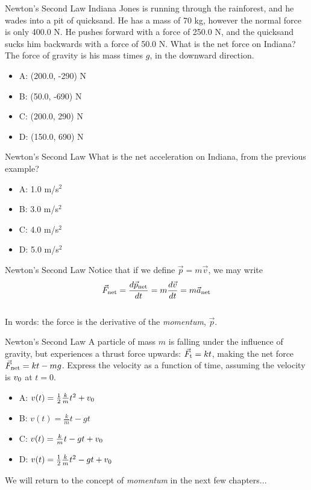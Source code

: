 \documentclass{beamer}
\begin{document}
\begin{frame}{Newton's Second Law}
Indiana Jones is running through the rainforest, and he wades into a pit of quicksand.  He has a mass of 70 kg, however the normal force is only 400.0 N.  He pushes forward with a force of 250.0 N, and the quicksand sucks him backwards with a force of 50.0 N.  What is the net force on Indiana?  The force of gravity is his mass times $g$, in the downward direction.
\begin{itemize}
\item A: (200.0, -290) N
\item B: (50.0, -690) N
\item C: (200.0, 290) N
\item D: (150.0, 690) N
\end{itemize}
\end{frame}

\begin{frame}{Newton's Second Law}
What is the net acceleration on Indiana, from the previous example?
\begin{itemize}
\item A: 1.0 m/s$^2$
\item B: 3.0 m/s$^2$
\item C: 4.0 m/s$^2$
\item D: 5.0 m/s$^2$
\end{itemize}
\end{frame}

\begin{frame}{Newton's Second Law}
Notice that if we define $\vec{p} = m\vec{v}$, we may write \\
\vspace{0.5cm}
\begin{equation}
\vec{F}_{\rm net} = \frac{d\vec{p}_{\rm net}}{dt} = m \frac{d\vec{v}}{dt} = m \vec{a}_{\rm net}
\end{equation} \\
\vspace{0.5cm}
In words: the force is the derivative of the \textit{momentum}, $\vec{p}$.
\end{frame}

\begin{frame}{Newton's Second Law}
A particle of mass $m$ is falling under the influence of gravity, but experiences a thrust force upwards: $\vec{F}_{\rm t} = kt$, making the net force $\vec{F}_{\rm net} = kt - mg$.  Express the velocity as a function of time, assuming the velocity is $v_{\rm 0}$ at $t=0$.
\begin{itemize}
\item A: $v(t) = \frac{1}{2} \frac{k}{m} t^2+v_{\rm 0}$
\item B:  $v(t) = \frac{k}{m} t - gt$
\item C:  $v(t) = \frac{k}{m} t - gt +v_{\rm 0}$
\item D: $v(t) = \frac{1}{2} \frac{k}{m} t^2 - gt +v_{\rm 0}$
\end{itemize}
\vspace{0.5cm}
We will return to the concept of \textit{momentum} in the next few chapters...
\end{frame}
\end{document}
